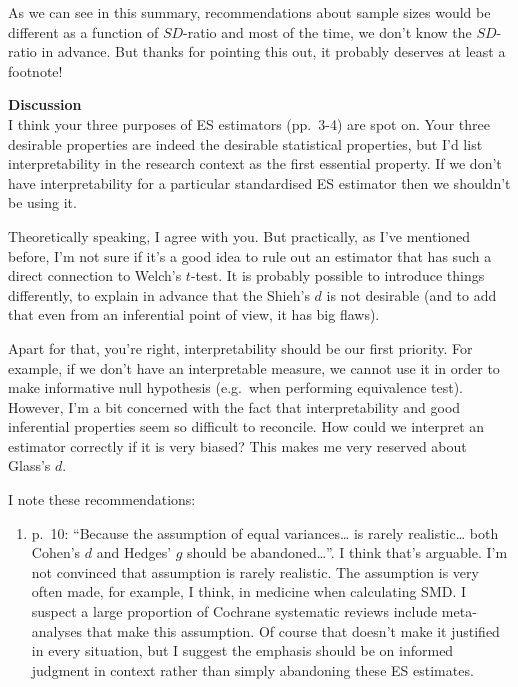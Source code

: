 \documentclass[
  12pt,
  french,
]{article}
\providecommand{\tightlist}{%
  \setlength{\itemsep}{0pt}\setlength{\parskip}{0pt}}
\begin{document}
As we can see in this summary, recommendations about sample sizes would
be different as a function of \(SD\)-ratio and most of the time, we
don't know the \(SD\)-ratio in advance. But thanks for pointing this
out, it probably deserves at least a footnote!

\color{black} \textbf{Discussion}\\
I think your three purposes of ES estimators (pp.~3-4) are spot on. Your
three desirable properties are indeed the desirable statistical
properties, but I'd list interpretability in the research context as the
first essential property. If we don't have interpretability for a
particular standardised ES estimator then we shouldn't be using it.

\color{blue} Theoretically speaking, I agree with you. But practically,
as I've mentioned before, I'm not sure if it's a good idea to rule out
an estimator that has such a direct connection to Welch's \(t\)-test. It
is probably possible to introduce things differently, to explain in
advance that the Shieh's \(d\) is not desirable (and to add that even
from an inferential point of view, it has big flaws).

Apart for that, you're right, interpretability should be our first
priority. For example, if we don't have an interpretable measure, we
cannot use it in order to make informative null hypothesis (e.g.~when
performing equivalence test). However, I'm a bit concerned with the fact
that interpretability and good inferential properties seem so difficult
to reconcile. How could we interpret an estimator correctly if it is
very biased? This makes me very reserved about Glass's \(d\).

\color{black} I note these recommendations:

\begin{enumerate}
\def\labelenumi{\arabic{enumi}.}
\tightlist
\item
  p.~10: ``Because the assumption of equal variances\ldots{} is rarely
  realistic\ldots{} both Cohen's \(d\) and Hedges' \(g\) should be
  abandoned\ldots{}''. I think that's arguable. I'm not convinced that
  assumption is rarely realistic. The assumption is very often made, for
  example, I think, in medicine when calculating SMD. I suspect a large
  proportion of Cochrane systematic reviews include meta-analyses that
  make this assumption. Of course that doesn't make it justified in
  every situation, but I suggest the emphasis should be on informed
  judgment in context rather than simply abandoning these ES estimates.
\end{enumerate}
\end{document}
